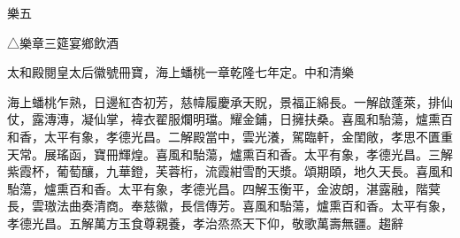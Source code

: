 
\begin{pinyinscope}
樂五

△樂章三筵宴鄉飲酒

太和殿閱皇太后徽號冊寶，海上蟠桃一章乾隆七年定。中和清樂

海上蟠桃乍熟，日邊紅杏初芳，慈幃履慶承天貺，景福正綿長。一解啟蓬萊，排仙仗，露漙漙，凝仙掌，褘衣翟服爛明璫。耀金鋪，日擁扶桑。喜風和駘蕩，爐熏百和香，太平有象，孝德光昌。二解殿當中，雲光瀁，駕臨軒，金閨敞，孝思不匱重天常。展瑤函，寶冊輝煌。喜風和駘蕩，爐熏百和香。太平有象，孝德光昌。三解紫霞杯，葡萄釀，九華鐙，芙蓉桁，流霞紺雪酌天漿。頌期頤，地久天長。喜風和駘蕩，爐熏百和香。太平有象，孝德光昌。四解玉衡平，金波朗，湛露融，階蓂長，雲璈法曲奏清商。奉慈徽，長信傳芳。喜風和駘蕩，爐熏百和香。太平有象，孝德光昌。五解萬方玉食尊親養，孝治烝烝天下仰，敬歌萬壽無疆。趨辭


\end{pinyinscope}
